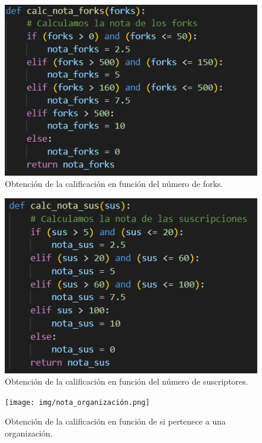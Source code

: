 \documentclass[a4paper, 12pt]{book}
\begin{document}
\begin{figure}
    \centering
    \includegraphics[width=1\textwidth, keepaspectratio]{img/nota_forks.png}
    \caption{Obtención de la calificación en función del número de forks.}\label{fig:nota_forks}
\end{figure}
\begin{figure}
    \centering
    \includegraphics[width=1\textwidth, keepaspectratio]{img/nota_suscriptores.png}
    \caption{Obtención de la calificación en función del número de suscriptores.}\label{fig:nota_suscriptores}
\end{figure}
\begin{figure}
    \centering
    \texttt{[image: img/nota\_organización.png]}
    \caption{Obtención de la calificación en función de si pertenece a una organización.}\label{fig:nota_organización}
\end{figure}
\end{document}
